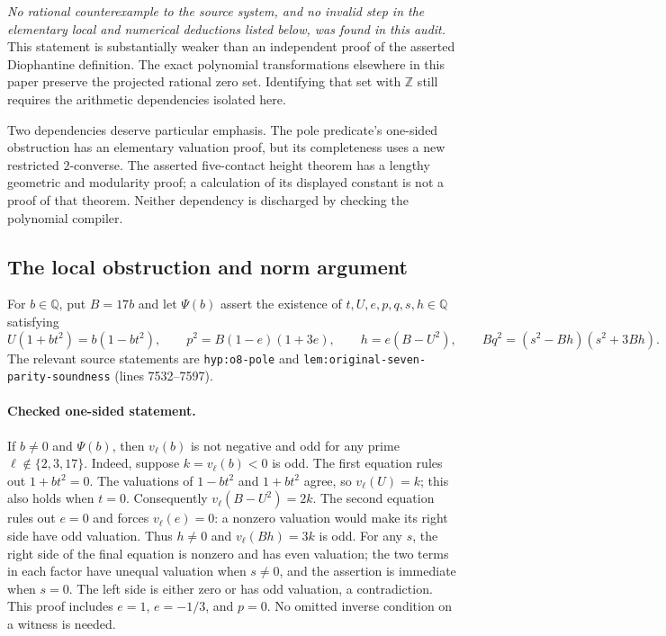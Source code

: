 \documentclass[11pt]{article}
\theoremstyle{definition}
\begin{document}
\emph{No rational counterexample to the source system, and no invalid
step in the elementary local and numerical deductions listed below, was
found in this audit.}  This statement is substantially weaker than an
independent proof of the asserted Diophantine definition.  The exact
polynomial transformations elsewhere in this paper preserve the projected
rational zero set.  Identifying that set with $\mathbb Z$ still requires
the arithmetic dependencies isolated here.

Two dependencies deserve particular emphasis.  The pole predicate's
one-sided obstruction has an elementary valuation proof, but its
completeness uses a new restricted $2$-converse.  The asserted
five-contact height theorem has a lengthy geometric and modularity proof;
a calculation of its displayed constant is not a proof of that theorem.
Neither dependency is discharged by checking the polynomial compiler.

\subsection{The local obstruction and norm argument}

For $b\in\mathbb Q$, put $B=17b$ and let $\Psi(b)$ assert the existence
of $t,U,e,p,q,s,h\in\mathbb Q$ satisfying
\[
 U(1+bt^2)=b(1-bt^2),\qquad p^2=B(1-e)(1+3e),\qquad
 h=e(B-U^2),\qquad Bq^2=(s^2-Bh)(s^2+3Bh).
\]
The relevant source statements are
\texttt{hyp:o8-pole} and \nolinkurl{lem:original-seven-parity-soundness}
(lines 7532--7597).

\paragraph{Checked one-sided statement.}
If $b\ne0$ and $\Psi(b)$, then $v_\ell(b)$ is not negative and odd
for any prime $\ell\notin\{2,3,17\}$.  Indeed, suppose
$k=v_\ell(b)<0$ is odd.  The first equation rules out $1+bt^2=0$.
The valuations of $1-bt^2$ and $1+bt^2$ agree, so $v_\ell(U)=k$;
this also holds when $t=0$.  Consequently
$v_\ell(B-U^2)=2k$.  The second equation rules out $e=0$ and forces
$v_\ell(e)=0$: a nonzero valuation would make its right side have
odd valuation.  Thus $h\ne0$ and $v_\ell(Bh)=3k$ is odd.
For any $s$, the right side of the final equation is nonzero and has
even valuation; the two terms in each factor have unequal valuation
when $s\ne0$, and the assertion is immediate when $s=0$.
The left side is either zero or has odd valuation, a contradiction.
This proof includes $e=1$, $e=-1/3$, and $p=0$.  No omitted inverse
condition on a witness is needed.
\end{document}
